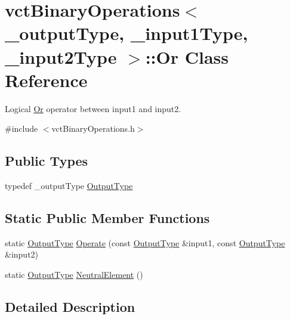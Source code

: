 \hypertarget{classvct_binary_operations_1_1_or}{}\section{vct\+Binary\+Operations$<$ \+\_\+output\+Type, \+\_\+input1\+Type, \+\_\+input2\+Type $>$\+:\+:Or Class Reference}
\label{classvct_binary_operations_1_1_or}


Logical \hyperlink{classvct_binary_operations_1_1_or}{Or} operator between input1 and input2.  




{\ttfamily \#include $<$vct\+Binary\+Operations.\+h$>$}

\subsection*{Public Types}
\begin{DoxyCompactItemize}
\item 
typedef \+\_\+output\+Type \hyperlink{classvct_binary_operations_1_1_or_a5401f56c720be18225261374125626f9}{Output\+Type}
\end{DoxyCompactItemize}
\subsection*{Static Public Member Functions}
\begin{DoxyCompactItemize}
\item 
static \hyperlink{classvct_binary_operations_1_1_or_a5401f56c720be18225261374125626f9}{Output\+Type} \hyperlink{classvct_binary_operations_1_1_or_a300ac74f6b8d4779339cc0766836fe55}{Operate} (const \hyperlink{classvct_binary_operations_1_1_or_a5401f56c720be18225261374125626f9}{Output\+Type} \&input1, const \hyperlink{classvct_binary_operations_1_1_or_a5401f56c720be18225261374125626f9}{Output\+Type} \&input2)
\item 
static \hyperlink{classvct_binary_operations_1_1_or_a5401f56c720be18225261374125626f9}{Output\+Type} \hyperlink{classvct_binary_operations_1_1_or_aa5370d181a9602330e386316eaa0d869}{Neutral\+Element} ()
\end{DoxyCompactItemize}


\subsection{Detailed Description}
